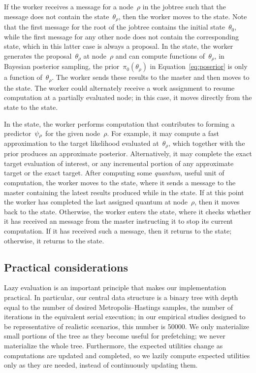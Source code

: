 \documentclass[angelino.tex]{subfiles}
\begin{document}
If the worker receives a \HAVEWORK message for a node~$\rho$ in the jobtree 
such that the message does not contain the state~$\theta_\rho$,
then the worker moves to the \init state.
%
Note that the first \HAVEWORK message for the root of the jobtree contains the
initial state~$\theta_0$, while the first \HAVEWORK message for any other node
does not contain the corresponding state, which in this latter case is always a
proposal.
%
In the \init state, the worker generates the proposal~$\theta_\rho$ at node~$\rho$
and can compute functions of~$\theta_\rho$, \eg in Bayesian posterior sampling,
the prior~$\pi_0(\theta_\rho)$ in Equation~\ref{eq:poserior} is only a function 
of~$\theta_\rho$.
%
The worker sends these results to the master and then moves to the \continue state.
%
The worker could alternately receive a work assignment to resume computation at
a partially evaluated node; in this case, it moves directly from the \want state to
the \continue state.

In the \continue state, the worker performs computation that contributes to
forming a predictor~$\psi_{\rho}$ for the given node~$\rho$.
%
For example, it may compute a fast approximation to the target likelihood evaluated
at~$\theta_\rho$, which together with the prior produces an approximate posterior.
%
Alternatively, it may complete the exact target evaluation of interest,
or any incremental portion of any approximate target or the exact target.
%
After computing some \emph{quantum}, \ie useful unit of computation,
the worker moves to the \sendupdate state, where it sends a message to the
master containing the latest results produced while in the \continue state.
%
If at this point the worker has completed the last assigned quantum at
node~$\rho$, then it moves back to the \want state.
%
Otherwise, the worker enters the \check state, where it checks whether it has
received an \ABANDON message from the master instructing it to stop its current
computation.
%
If it has received such a message, then it returns to the \want state;
otherwise, it returns to the \continue state.

\subsection{Practical considerations}
\label{sec:practical}

Lazy evaluation is an important principle that makes our implementation practical.
%
In particular, our central data structure is a binary tree with depth equal
to the number of desired Metropolis--Hastings samples,
\ie the number of iterations in the equivalent serial execution;
in our empirical studies designed to be representative of realistic scenarios,
this number is 50000.
%
We only materialize small portions of the tree as they become useful for
prefetching; we never materialize the whole tree.
%
Furthermore, the expected utilities change as computations are updated and
completed, so we lazily compute expected utilities only as they are needed,
instead of continuously updating them.
\end{document}
